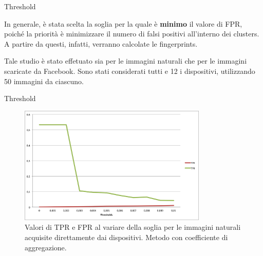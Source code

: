 \begin{tframe}{Threshold}

In generale, è stata scelta la soglia per la quale è \textbf{minimo} il valore di FPR, poiché la priorità è minimizzare il numero di falsi positivi all'interno dei clusters. A partire da questi, infatti, verranno calcolate le fingerprints.

\vspace{0.3cm}

Tale studio è stato effetuato sia per le immagini naturali che per le immagini scaricate da Facebook. Sono stati considerati tutti e 12 i dispositivi, utilizzando 50 immagini da ciascuno.

\end{tframe}

\begin{tframe}{Threshold}

\begin{figure}[h]
\begin{center}
\includegraphics[width=0.8\textwidth]{../images/soglia_imgnat_AC.png}
\end{center}
  \caption{Valori di TPR e FPR al variare della soglia per le immagini naturali acquisite direttamente dai dispositivi. Metodo con coefficiente di aggregazione.}
\label{fig:soglia AC}
\end{figure}

\end{tframe}

